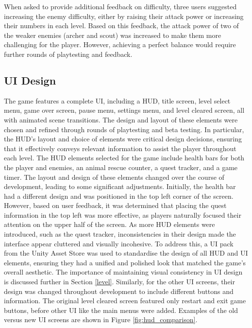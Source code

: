 \documentclass[10pt]{final_report}
\begin{document}
When asked to provide additional feedback on difficulty, three users suggested increasing the enemy difficulty, either by raising their attack power or increasing their numbers in each level. Based on this feedback, the attack power of two of the weaker enemies (archer and scout) was increased to make them more challenging for the player. However, achieving a perfect balance would require further rounds of playtesting and feedback.

\subsection{UI Design}\label{UIDesign}

The game features a complete UI, including a HUD, title screen, level select menu, game over screen, pause menu, settings menu, and level cleared screen, all with animated scene transitions. The design and layout of these elements were chosen and refined through rounds of playtesting and beta testing. In particular, the HUD's layout and choice of elements were critical design decisions, ensuring that it effectively conveys relevant information to assist the player throughout each level.
\newline
The HUD elements selected for the game include health bars for both the player and enemies, an animal rescue counter, a quest tracker, and a game timer. The layout and design of these elements changed over the course of development, leading to some significant adjustments. Initially, the health bar had a different design and was positioned in the top left corner of the screen. However, based on user feedback, it was determined that placing the quest information in the top left was more effective, as players naturally focused their attention on the upper half of the screen.
\newline
As more HUD elements were introduced, such as the quest tracker, inconsistencies in their design made the interface appear cluttered and visually incohesive. To address this, a UI pack from the Unity Asset Store was used to standardise the design of all HUD and UI elements, ensuring they had a unified and polished look that matched the game’s overall aesthetic. The importance of maintaining visual consistency in UI design is discussed further in Section \ref{level}. Similarly, for the other UI screens, their design was changed throughout development to include different buttons and information. The original level cleared screen featured only restart and exit game buttons, before other UI like the main menus were added. Examples of the old versus new UI screens are shown in Figure \ref{fig:hud_comparison}.
\end{document}
